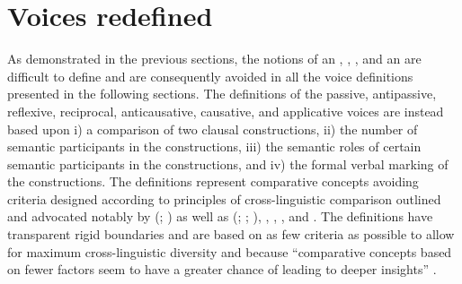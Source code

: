 \section{Voices redefined} \label{voices-redefined}
As demonstrated in the previous sections, the notions of an , , , and an  are difficult to define and are consequently avoided in all the voice definitions presented in the following sections. The definitions of the passive, antipassive, reflexive, reciprocal, anticausative, causative, and applicative voices are instead based upon i) a comparison of two clausal constructions, ii) the number of semantic participants in the constructions, iii) the semantic roles of certain semantic participants in the constructions, and iv) the formal verbal marking of the constructions. The definitions represent comparative concepts avoiding  criteria designed according to principles of cross-linguistic comparison outlined and advocated notably by \citeauthor{haspelmath:2010a} (\citeyear{haspelmath:2010a, haspelmath:2010b, haspelmath:2011a, haspelmath:2011b}; \citeyear{haspelmath:2014, haspelmath:2016a, haspelmath:2016b, haspelmath:2018}) as well as \citeauthor{croft:1990} (\citeyear[11f.]{croft:1990}; \citeyear[88]{croft:1995}; \citeyear[13f.]{croft:2003}), \cite{dryer:1997, dryer:2016}, \citet[22ff.]{givon:2001a}, \citet[10ff.]{song:2001}, and \cite{stassen:2010}. The definitions have transparent rigid boundaries and are based on as few criteria as possible to allow for maximum cross-linguistic diversity and because “comparative concepts based on fewer factors seem to have a greater chance of leading to deeper insights” \citep[677]{haspelmath:2010a}.

